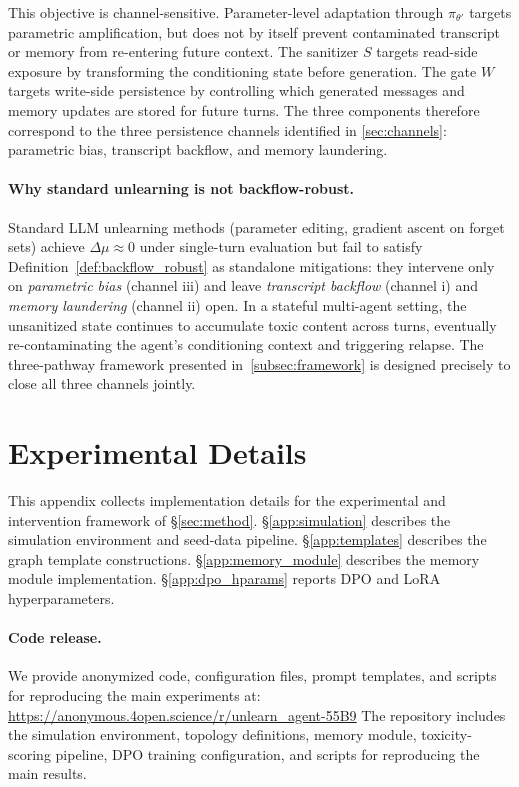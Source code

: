 This objective is channel-sensitive. Parameter-level adaptation through $\pi_{\theta'}$ targets parametric amplification, but does not by itself prevent contaminated transcript or memory from re-entering future context. The sanitizer $S$ targets read-side exposure by transforming the conditioning state before generation. The gate $W$ targets write-side persistence by controlling which generated messages and memory updates are stored for future turns. The three components therefore correspond to the three persistence channels identified in \cref{sec:channels}: parametric bias, transcript backflow, and memory laundering.

\paragraph{Why standard unlearning is not backflow-robust.}
Standard LLM unlearning methods (parameter editing, gradient ascent on forget sets) achieve $\Delta\mu \approx 0$ under single-turn evaluation but fail to satisfy Definition~\ref{def:backflow_robust} as standalone mitigations: they intervene only on \emph{parametric bias} (channel iii) and leave \emph{transcript backflow} (channel i) and \emph{memory laundering} (channel ii) open. In a stateful multi-agent setting, the unsanitized state continues to accumulate toxic content across turns, eventually re-contaminating the agent's conditioning context and triggering relapse. The three-pathway framework presented in~\cref{subsec:framework} is designed precisely to close all three channels jointly.
\section{Experimental Details}
\label{app:experimental_details}

This appendix collects implementation details for the experimental and intervention framework of \S\ref{sec:method}.
\S\ref{app:simulation} describes the simulation environment and seed-data pipeline.
\S\ref{app:templates} describes the graph template constructions.
\S\ref{app:memory_module} describes the memory module implementation.
\S\ref{app:dpo_hparams} reports DPO and LoRA hyperparameters.

\paragraph{Code release.}
We provide anonymized code, configuration files, prompt templates, and scripts for reproducing the main experiments at: \url{https://anonymous.4open.science/r/unlearn_agent-55B9}
The repository includes the simulation environment, topology definitions, memory module, toxicity-scoring pipeline, DPO training configuration, and scripts for reproducing the main results.

